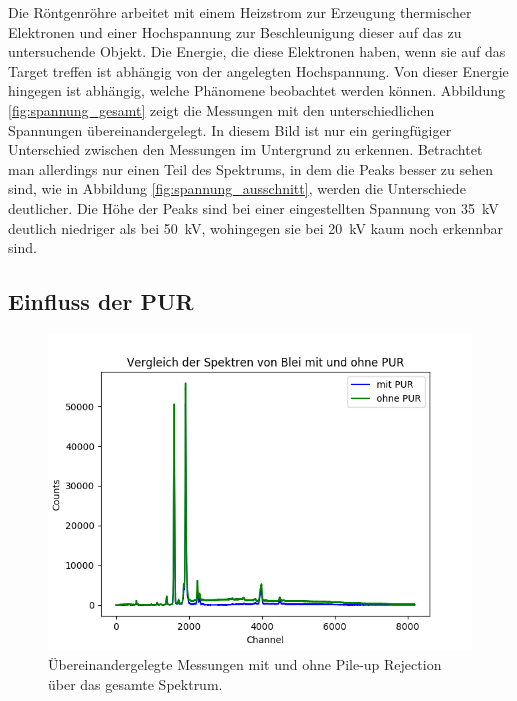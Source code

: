 \documentclass[12pt,a4paper]{article}
\begin{document}
Die Röntgenröhre arbeitet mit einem Heizstrom zur Erzeugung thermischer Elektronen und einer Hochspannung zur Beschleunigung dieser auf das zu untersuchende Objekt. Die Energie, die diese Elektronen haben, wenn sie auf das Target treffen ist abhängig von der angelegten Hochspannung. Von dieser Energie hingegen ist abhängig, welche Phänomene beobachtet werden können. Abbildung \ref{fig:spannung_gesamt} zeigt die Messungen mit den unterschiedlichen Spannungen übereinandergelegt. In diesem Bild ist nur ein geringfügiger Unterschied zwischen den Messungen im Untergrund zu erkennen. Betrachtet man allerdings nur einen Teil des Spektrums, in dem die Peaks besser zu sehen sind, wie in Abbildung \ref{fig:spannung_ausschnitt}, werden die Unterschiede deutlicher. Die Höhe der Peaks sind bei einer eingestellten Spannung von \SI{35}{kV} deutlich niedriger als bei \SI{50}{kV}, wohingegen sie bei \SI{20}{kV} kaum noch erkennbar sind.

\subsection{Einfluss der PUR}

\begin{figure}
\centering
\includegraphics[scale=0.8]{Bilder/roentgen/PUR/Gesamt.png}
\caption{Übereinandergelegte Messungen mit und ohne Pile-up Rejection über das gesamte Spektrum.}
\label{fig:PUR_gesamt}
\end{figure}
\end{document}

